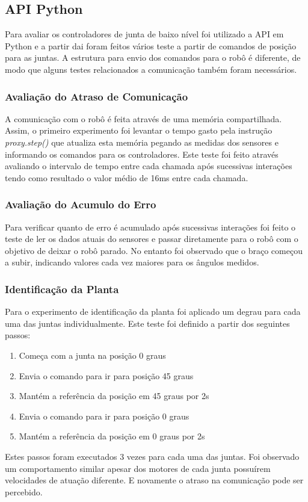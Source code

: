 
\subsection{API Python}

Para avaliar os controladores de junta de baixo nível foi utilizado a API em Python e a partir dai foram feitos vários teste a partir de comandos de posição para as juntas. A estrutura para envio dos comandos para o robô é diferente, de modo que alguns testes relacionados a comunicação também foram necessários.

\subsubsection{Avaliação do Atraso de Comunicação}
A comunicação com o robô é feita através de uma memória compartilhada. Assim, o primeiro experimento foi levantar o tempo gasto pela instrução \textit{proxy.step()} que atualiza esta memória pegando as medidas dos sensores e informando os comandos para os controladores. Este teste foi feito através avaliando o intervalo de tempo entre cada chamada após sucessivas interações tendo como resultado o valor médio de 16ms entre cada chamada.

\subsubsection{Avaliação do Acumulo do Erro}
Para verificar quanto de erro é acumulado após sucessivas interações foi feito o teste de ler os dados atuais do sensores e passar diretamente para o robô com o objetivo de deixar o robô parado. No entanto foi observado que o braço começou a subir, indicando valores cada vez maiores para os ângulos medidos.

\subsubsection{Identificação da Planta}
Para o experimento de identificação da planta foi aplicado um degrau para cada uma das juntas individualmente. Este teste foi definido a partir dos seguintes passos:

\begin{enumerate}
    \item Começa com a junta na posição 0 graus
    \item Envia o comando para ir para posição 45 graus
    \item Mantém a referência da posição em 45 graus por 2s
    \item Envia o comando para ir para posição 0 graus
    \item Mantém a referência da posição em 0 graus por 2s
\end{enumerate}

Estes passos foram executados 3 vezes para cada uma das juntas. Foi observado um comportamento similar apesar dos motores de cada junta possuírem velocidades de atuação diferente. E novamente o atraso na comunicação pode ser percebido.
